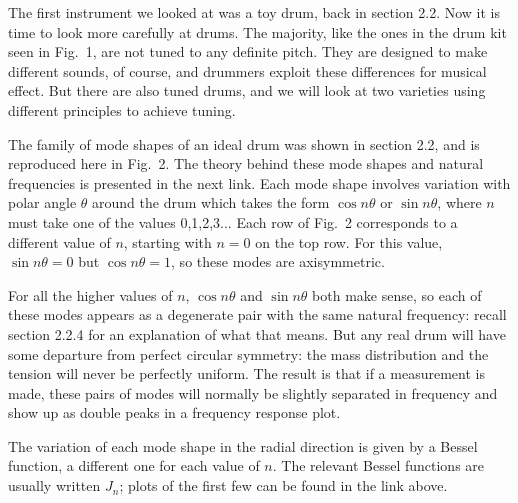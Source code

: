 

  The first instrument we looked at was a toy drum, back in section 2.2. Now it 
  is time to look more carefully at drums. The majority, like the ones in the 
  drum kit seen in Fig.\ 1, are not tuned to any definite pitch. They are 
  designed to make different sounds, of course, and drummers exploit these 
  differences for musical effect. But there are also tuned drums, and we will 
  look at two varieties using different principles to achieve tuning. 


  The family of mode shapes of an ideal drum was shown in section 2.2, and is 
  reproduced here in Fig.\ 2. The theory behind these mode shapes and natural 
  frequencies is presented in the next link. Each mode shape involves variation 
  with polar angle $\theta$ around the drum which takes the form $\cos n 
  \theta$ or $\sin n \theta$, where $n$ must take one of the values 0,1,2,3... 
  Each row of Fig.\ 2 corresponds to a different value of $n$, starting with 
  $n=0$ on the top row. For this value, $\sin n \theta =0$ but $\cos n \theta = 
  1$, so these modes are axisymmetric. 

  For all the higher values of $n$, $\cos n \theta$ and $\sin n \theta$ both 
  make sense, so each of these modes appears as a degenerate pair with the same 
  natural frequency: recall section 2.2.4 for an explanation of what that 
  means. But any real drum will have some departure from perfect circular 
  symmetry: the mass distribution and the tension will never be perfectly 
  uniform. The result is that if a measurement is made, these pairs of modes 
  will normally be slightly separated in frequency and show up as double peaks 
  in a frequency response plot. 

  The variation of each mode shape in the radial direction is given by a Bessel 
  function, a different one for each value of $n$. The relevant Bessel 
  functions are usually written $J_n$; plots of the first few can be found in 
  the link above. 


